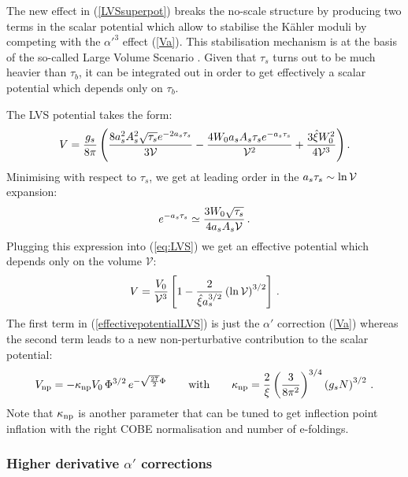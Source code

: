 \documentclass[11pt,a4paper]{article}
\newcommand{\be}{\begin{equation}}
\newcommand{\ee}{\end{equation}}
\newcommand\vo{{\mathcal{V}}}
\newcommand{\V}{{\cal{V}}}
\begin{document}
The new effect in (\ref{LVSsuperpot}) breaks the no-scale structure by producing two terms in the scalar potential which allow to stabilise the K\"ahler moduli by competing with the $\alpha'^3$ effect (\ref{Va}). This stabilisation mechanism is at the basis of the so-called Large Volume Scenario \cite{Balasubramanian:2005zx}. Given that $\tau_s$ turns out to be much heavier than $\tau_b$, it can be integrated out in order to get effectively a scalar potential which depends only on $\tau_b$.

The LVS potential takes the form:
\be
V = \frac{g_s}{8 \pi} \left(\frac{8  a_s^2 A_s^2 \sqrt{\tau_s} e^{-2 a_s \tau_s}}{3 \V} - \frac{4 W_0 a_s A_s \tau_s e^{-a_s \tau_s}}{\V^2} + \frac{3 \hat{\xi} W_0^2}{4 \V^3}\right).
\label{eq:LVS}
\ee
Minimising with respect to $\tau_s$, we get at leading order in the $a_s \tau_s \sim \ln \V$ expansion:
\be
e^{-a_s \tau_s} \simeq \frac{3 W_0 \sqrt{\tau_s}}{4 a_s A_s \V}\,.
\ee 
Plugging this expression into (\ref{eq:LVS}) we get an effective potential which depends only on the volume $\vo$:
\be
V = \frac{V_0}{\vo^3} \left[1 - \frac{2}{\hat\xi a_s^{3/2}} \left(\ln \V\right)^{3/2}\right]\,.
\label{effectivepotentialLVS}
\ee
The first term in (\ref{effectivepotentialLVS}) is just the $\alpha'$ correction (\ref{Va}) whereas the second term leads to a new non-perturbative contribution to the scalar potential:
\be
V_{\rm np} = - \kappa_{\rm np} V_0 \,\Phi^{3/2}\,e^{-\sqrt{\frac{27}{2}} \Phi} \qquad\text{with}\qquad 
\kappa_{\rm np}=\frac{2}{\xi}\left(\frac{3}{8\pi^2}\right)^{3/4}\left(g_s N\right)^{3/2}\,.
\label{Vnp}
\ee
Note that $\kappa_{\rm np}$ is another parameter that can be tuned to get inflection point inflation with the right COBE normalisation and number of e-foldings.


\subsubsection{Higher derivative $\alpha'$ corrections}
\end{document}
